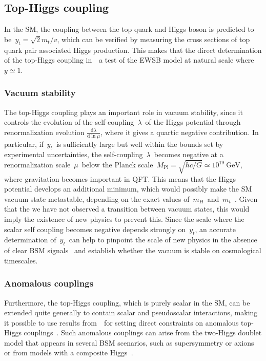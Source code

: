 \subsection{Top-Higgs coupling}
\label{sec:top_higgs}
In the SM, the coupling between the top quark and Higgs boson is predicted to be~$y_t = \sqrt{2} m_t / v$, which can be verified by measuring the cross sections of top quark pair associated Higgs production. This makes that the direct determination of the top-Higgs coupling in~\ttH~a test of the EWSB model at natural scale where~$y \simeq 1$. 

\subsubsection{Vacuum stability}
The top-Higgs coupling plays an important role in vacuum stability, since it controls the evolution of the self-coupling~$\lambda$~of the Higgs potential through renormalization evolution $\frac{\mathrm{d}\lambda}{\mathrm{d}\ln{\mu}}$, where it gives a quartic negative contribution. In particular, if~$y_t$~is sufficiently large but well within the bounds set by experimental uncertainties, the self-coupling~$\lambda$~becomes negative at a renormalization scale~$\mu$~below the Planck scale~$M_{\mathrm{Pl}} = \sqrt{\bar{h}c / G} \simeq 10^{19}~\mathrm{GeV}$, where gravitation becomes important in QFT. This means that the Higgs potential develops an additional minimum, which would possibly make the SM vacuum state metastable, depending on the exact values of~$m_H$~and~$m_t$~\cite{Degrassi:2012ry}. Given that the we have not observed a transition between vacuum states, this would imply the existence of new physics to prevent this. Since the scale where the scalar self coupling becomes negative depends strongly on~$y_t$, an accurate determination of~$y_t$~can help to pinpoint the scale of new physics in the absence of clear BSM signals~\cite{Bezrukov:2014ina} and establish whether the vacuum is stable on cosmological timescales.

\subsubsection{Anomalous couplings}
Furthermore, the top-Higgs coupling, which is purely scalar in the SM, can be extended quite generally to contain scalar and pseudoscalar interactions, making it possible to use results from~\ttH~for setting direct constraints on anomalous top-Higgs couplings~\cite{Kobakhidze:2016mfx}. Such anomalous couplings can arise from the two-Higgs doublet model that appears in several BSM scenarios, such as supersymmetry or axions~\cite{Branco:2011iw} or from models with a composite Higgs~\cite{Liu:2017dsz}.

